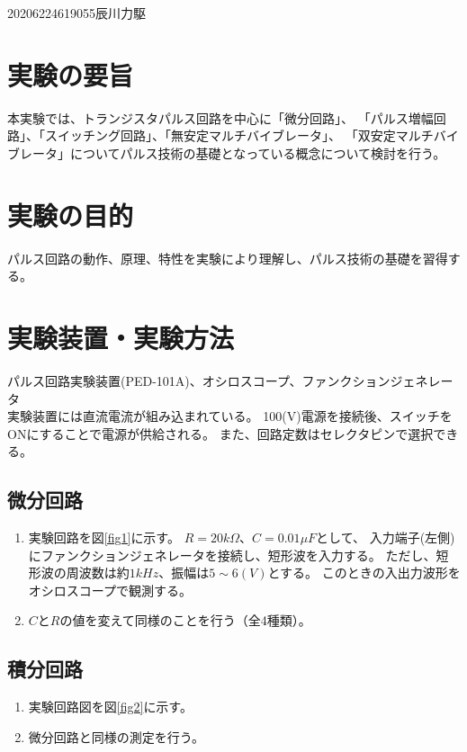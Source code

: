 \documentclass[12pt]{jarticle}
\begin{document}
{2020}{6}{22}{4619055}{辰川力駆}


\section{実験の要旨}
本実験では、トランジスタパルス回路を中心に「微分回路」、
「パルス増幅回路」、「スイッチング回路」、「無安定マルチバイブレータ」、
「双安定マルチバイブレータ」についてパルス技術の基礎となっている概念について検討を行う。

\section{実験の目的}
パルス回路の動作、原理、特性を実験により理解し、パルス技術の基礎を習得する。

\section{実験装置・実験方法}
パルス回路実験装置(PED-101A)、オシロスコープ、ファンクションジェネレータ\\

実験装置には直流電流が組み込まれている。
100(V)電源を接続後、スイッチをONにすることで電源が供給される。
また、回路定数はセレクタピンで選択できる。

\subsection{微分回路}
\begin{enumerate}
    \item 実験回路を図\ref{fig1}に示す。
          $R = 20k\Omega$、$C = 0.01\mu F$として、
          入力端子(左側)にファンクションジェネレータを接続し、短形波を入力する。
          ただし、短形波の周波数は約$1kHz$、振幅は$5\sim6(V)$とする。
          このときの入出力波形をオシロスコープで観測する。
    \item $C$と$R$の値を変えて同様のことを行う（全4種類）。
\end{enumerate}
\subsection{積分回路}
\begin{enumerate}
    \item 実験回路図を図\ref{fig2}に示す。
    \item 微分回路と同様の測定を行う。
\end{enumerate}
\end{document}
